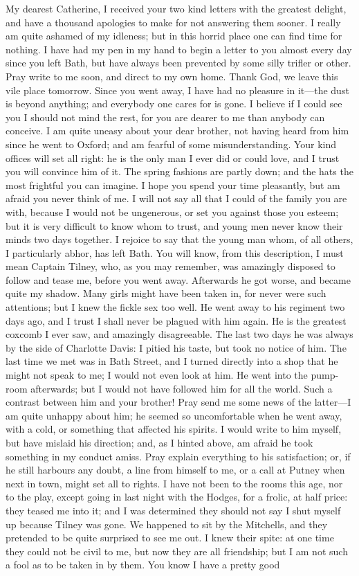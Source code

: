 My dearest Catherine,\crlf
I received your two kind letters with the greatest delight, and have a thousand apologies to make for not answering them sooner. I really am quite ashamed of my idleness; but in this horrid place one can find time for nothing. I have had my pen in my hand to begin a letter to you almost every day since you left Bath, but have always been prevented by some silly trifler or other. Pray write to me soon, and direct to my own home. Thank God, we leave this vile place tomorrow. Since you went away, I have had no pleasure in it---the dust is beyond anything; and everybody one cares for is gone. I believe if I could see you I should not mind the rest, for you are dearer to me than anybody can conceive. I am quite uneasy about your dear brother, not having heard from him since he went to Oxford; and am fearful of some misunderstanding. Your kind offices will set all right: he is the only man I ever did or could love, and I trust you will convince him of it. The spring fashions are partly down; and the hats the most frightful you can imagine. I hope you spend your time pleasantly, but am afraid you never think of me. I will not say all that I could of the family you are with, because I would not be ungenerous, or set you against those you esteem; but it is very difficult to know whom to trust, and young men never know their minds two days together. I rejoice to say that the young man whom, of all others, I particularly abhor, has left Bath. You will know, from this description, I must mean Captain Tilney, who, as you may remember, was amazingly disposed to follow and tease me, before you went away. Afterwards he got worse, and became quite my shadow. Many girls might have been taken in, for never were such attentions; but I knew the fickle sex too well. He went away to his regiment two days ago, and I trust I shall never be plagued with him again. He is the greatest coxcomb I ever saw, and amazingly disagreeable. The last two days he was always by the side of Charlotte Davis: I pitied his taste, but took no notice of him. The last time we met was in Bath Street, and I turned directly into a shop that he might not speak to me; I would not even look at him. He went into the pump-room afterwards; but I would not have followed him for all the world. Such a contrast between him and your brother! Pray send me some news of the latter---I am quite unhappy about him; he seemed so uncomfortable when he went away, with a cold, or something that affected his spirits. I would write to him myself, but have mislaid his direction; and, as I hinted above, am afraid he took something in my conduct amiss. Pray explain everything to his satisfaction; or, if he still harbours any doubt, a line from himself to me, or a call at Putney when next in town, might set all to rights. I have not been to the rooms this age, nor to the play, except going in last night with the Hodges, for a frolic, at half price: they teased me into it; and I was determined they should not say I shut myself up because Tilney was gone. We happened to sit by the Mitchells, and they pretended to be quite surprised to see me out. I knew their spite: at one time they could not be civil to me, but now they are all friendship; but I am not such a fool as to be taken in by them. You know I have a pretty good 